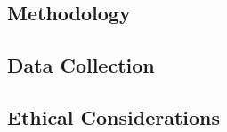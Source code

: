 \subsection{Methodology}
\subsection{Data Collection}
\label{subsec:datacollection}


\subsection{Ethical Considerations}
